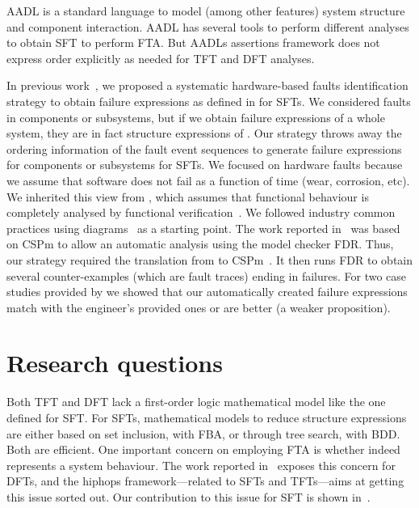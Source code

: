\Ac{AADL} is a standard language to model (among other features) system structure and component interaction. 
\Ac{AADL} has several tools to perform different analyses to obtain \ac{SFT} to perform \ac{FTA}.
But \acp{AADL} assertions framework does not express order explicitly as needed for \ac{TFT} and \ac{DFT} analyses.

In previous work~\cite{Didier2012,DM2012}, we proposed a systematic hardware-based faults identification strategy to obtain failure expressions as defined in  for \acp{SFT}.
%
We considered faults in components or subsystems, but if we obtain failure expressions of a whole system, they are in fact structure expressions of .
%
Our strategy throws away the ordering information of the fault event sequences to generate failure expressions for components or subsystems for \acp{SFT}.
%
%
We focused on hardware faults because we assume that software does not fail as a function of time (wear, corrosion, etc).
%
We inherited this view from \embraer, which assumes that functional behaviour is completely analysed by functional verification~\cite{SP2011}.
%
We followed industry common practices using \simulink diagrams~\cite{Nise1992} as a starting point.
%
The work reported in~\cite{DM2012} was based on \ac{CSPm} to allow an automatic analysis using the model checker \acs{FDR}.
%
Thus, our strategy required the translation from \simulink to \ac{CSPm}~\cite{JMS+2011}.
%
It then runs \acs{FDR} to obtain several counter-examples (which are fault traces) ending in failures.
%
For two case studies provided by \embraer we showed that our automatically created failure expressions match with the engineer's provided ones or are better (a weaker proposition).

\section{Research questions}
\label{sec:research-questions}

Both \ac{TFT} and \ac{DFT} lack a first-order logic mathematical model like the one defined for \ac{SFT}.
For \acp{SFT}, mathematical models to reduce structure expressions are either based on set inclusion, with \ac{FBA}, or through tree search, with \ac{BDD}.
Both are efficient.
One important concern on employing \ac{FTA} is whether  indeed represents a system behaviour.
The work reported in~\cite{MCS+1999} exposes this concern for \acp{DFT}, and the \ac{hiphops} framework---related to \acp{SFT} and \acp{TFT}---aims at getting this issue sorted out.
Our contribution to this issue for \ac{SFT} is shown in~\cite{DM2012,Didier2012}.

